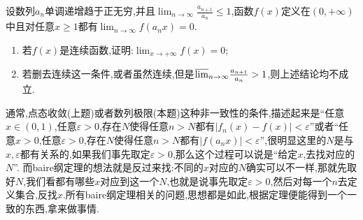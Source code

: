 \documentclass[../../main.tex]{subfiles}%
\begin{document}
\begin{example}
设数列\(a_n\)单调递增趋于正无穷,并且\(\lim_{n \to \infty} \frac{a_{n + 1}}{a_n} \leqslant 1\),函数\(f(x)\)定义在\((0,+\infty)\)中且对任意\(x\geqslant 1\)都有\(\lim_{n \to \infty} f(a_nx) = 0\).
\begin{enumerate}
\item  若\(f(x)\)是连续函数,证明:\(\lim_{x \to +\infty} f(x) = 0\);
\item 若删去连续这一条件,或者虽然连续,但是\({\varlimsup_{n \to \infty}} \frac{a_{n + 1}}{a_n} > 1\),则上述结论均不成立.
\end{enumerate}
\end{example}
\begin{remark}
通常,点态收敛(上题)或者数列极限(本题)这种非一致性的条件,描述起来是“任意\(x\in(0,1)\),任意\(\varepsilon > 0\),存在\(N\)使得任意\(n > N\)都有\(|f_n(x)-f(x)|<\varepsilon\)”或者“任意\(x > 0\),任意\(\varepsilon > 0\),存在\(N\)使得任意\(n > N\)都有\(|f(a_nx)|<\varepsilon\)”,很明显这里的\(N\)是与\(x,\varepsilon\)都有关系的,如果我们事先取定\(\varepsilon > 0\),那么这个过程可以说是“给定\(x\),去找对应的\(N\)”.
而baire纲定理的想法就是反过来找:不同的\(x\)对应的\(N\)确实可以不一样,那就先取好\(N\),我们看都有哪些\(x\)对应到这一个\(N\),也就是说事先取定\(\varepsilon > 0\),然后对每一个\(n\)去定义集合,反找\(x\).所有baire纲定理相关的问题,思想都是如此,根据定理便能得到一个一致的东西,拿来做事情.
\end{remark}
\end{document}
